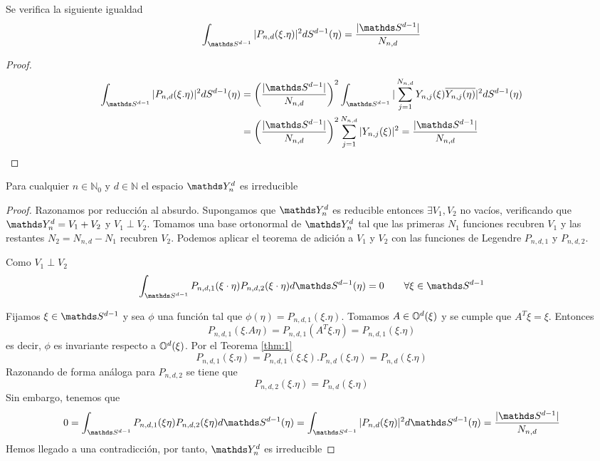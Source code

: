 \begin{prop}\label{prop:2}Se verifica la siguiente igualdad
	$$\sphint |P_{n,d}(\xi.\eta)|^2 dS^{d-1}(\eta) = \frac{|\sphere|}{N_{n,d}}
	$$
\end{prop}
\begin{proof}

	\begin{gather*}
		\begin{aligned}
	\sphint |P_{n,d}(\xi.\eta)|^2 dS^{d-1}(\eta) &=  \left(\frac{|\sphere|}{N_{n,d}}\right)^2 \sphint |\sum_{j=1}^{N_{n,d}} Y_{n,j}(\xi)\overline{Y_{n,j}(\eta)}|^2 dS^{d-1}(\eta) \\ &=  \left(\frac{|\sphere|}{N_{n,d}}\right)^2 \sum_{j=1}^{N_{n,d}} |Y_{n,j}(\xi)|^2 = \frac{|\sphere|}{N_{n,d}}
	\end{aligned}
	\end{gather*}	
	
	
	
\end{proof}
\begin{thm}Para cualquier $n\in\mathds{N}_0$ y $d\in\mathds{N}$ el espacio $\spharm$ es irreducible
\end{thm}
\begin{proof}
Razonamos por reducción al absurdo. Supongamos que $\spharm$ es reducible entonces $\exists V_1,V_2$ no vacíos, verificando que $\spharm = V_1 + V_2$ y $V_1 \perp V_2$. Tomamos una base ortonormal de $\spharm$ tal que las primeras $N_1$ funciones recubren $V_1$ y las restantes $N_2 = N_{n,d} - N_1$ recubren  $V_2$. Podemos aplicar el teorema de adición a $V_1$ y $V_2$ con las funciones de Legendre $P_{n,d,1}$ y $P_{n,d,2}$.
\medskip

Como $V_1 \perp V_2$ 
\begin{equation}\label{eq:1}
\int_{\sphere} P_{n,d,1}(\xi\cdot\eta)P_{n,d,2}(\xi\cdot\eta)d\sphere(\eta) = 0 \qquad \forall\xi\in\sphere
\end{equation}

Fijamos $\xi\in\sphere$ y sea $\phi$ una función tal que $\phi(\eta) = P_{n,d,1}(\xi.\eta)$. Tomamos $A\in\mathbb{O}^d(\xi)$ y se cumple que $A^T\xi= \xi$. Entonces
$$P_{n,d,1}(\xi.A\eta) = P_{n,d,1}(A^T\xi.\eta)=P_{n,d,1}(\xi.\eta)
$$
es decir, $\phi$ es invariante respecto a $\mathbb{O}^d(\xi)$. Por el Teorema \ref{thm:1}
$$
P_{n,d,1}(\xi.\eta) = P_{n,d,1}(\xi.\xi).P_{n,d}(\xi.\eta) = P_{n,d}(\xi.\eta)
$$
Razonando de forma análoga para $P_{n,d,2}$ se tiene que
$$
P_{n,d,2}(\xi.\eta) = P_{n,d}(\xi.\eta)
$$
Sin embargo, tenemos que 
$$ 0=\int_{\sphere}P_{n,d,1}(\xi\eta)P_{n,d,2}(\xi\eta)d\sphere(\eta) =\int_{\sphere} |P_{n,d}(\xi\eta)|^2 d\sphere(\eta) = \frac{|\sphere|}{N_{n,d}}
$$
Hemos llegado a una contradicción, por tanto, $\spharm$ es irreducible
\end{proof}
